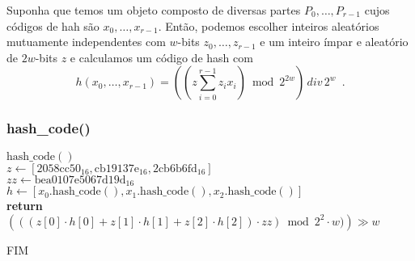 \documentclass{beamer}
\begin{document}
\begin{frame}
Suponha que temos um objeto composto de diversas partes
$P_0,\ldots,P_{r-1}$ cujos códigos de hah são $\ensuremath{\ensuremath{x}}_0,\ldots,\ensuremath{\ensuremath{x}}_{r-1}$.
Então, podemos escolher inteiros aleatórios mutuamente independentes com \ensuremath{\ensuremath{w}}-bits
$\ensuremath{\ensuremath{z}}_0,\ldots,\ensuremath{\ensuremath{z}}_{r-1}$ e um inteiro ímpar e aleatório de $2\ensuremath{\ensuremath{w}}$-bits \ensuremath{\ensuremath{z}} e calculamos um código de hash com
\[
   h(\ensuremath{\ensuremath{x}}_0,\ldots,\ensuremath{\ensuremath{x}}_{r-1}) =  
   \left(\left(\ensuremath{\ensuremath{z}}\sum_{i=0}^{r-1} \ensuremath{\ensuremath{z}}_i \ensuremath{\ensuremath{x}}_i\right)\bmod 2^{2\ensuremath{\ensuremath{w}}}\right)
   \, div \, 2^w \enspace .
\]

\end{frame}

\begin{frame}[shrink]
\frametitle{{hash\_code}()}
\begin{oframed}
\begin{flushleft}
 \ensuremath{\mathrm{hash\_code}()}\\
\hspace*{1em}  \ensuremath{z \gets  [\ensuremath{\mathrm{2058cc50}_{16}, \mathrm{cb19137e}_{16}, \mathrm{2cb6b6fd}_{16}}]}\\
\hspace*{1em} \ensuremath{\ensuremath{\mathit{zz}} \gets  \ensuremath{\mathrm{bea0107e5067d19d}_{16}}}\\
 \hspace*{1em} \ensuremath{h \gets  [\ensuremath{\ensuremath{\mathit{x_0}}.\mathrm{hash\_code}(), \ensuremath{\mathit{x_1}}.\mathrm{hash\_code}(), \ensuremath{\mathit{x_2}}.\mathrm{hash\_code}()}]}\\
 \hspace*{1em} {\color{black} \textbf{return}} \ensuremath{((\ensuremath{(z[0]\cdot h[0] + z[1]\cdot h[1] + z[2]\cdot h[2])\cdot zz})\bmod \ensuremath{2^{2}\cdot w)}) \ensuremath{\gg} w}\\
\end{flushleft}
\end{oframed}

\end{frame}



\begin{frame}
FIM
\end{frame}
\end{document}
